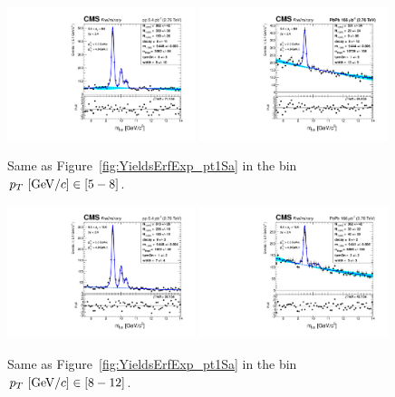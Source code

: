 \begin{figure}
   \includegraphics[width=0.49\textwidth]{Chapters/aYield/pp/pt_3p5_4/Pt/Pt_5_8/pp2p76tev_Pt_5_8_fsr1.pdf}  
  \includegraphics[width=0.49\textwidth]{Chapters/aYield/PbPb/pt_3p5_4/Pt/Pt_5_8/PbPb_Pt_5_8_fsr1.pdf}
 
  \caption{Same as Figure~\ref{fig:YieldsErfExp_pt1Sa} in the bin $p_{T}~[{\rm GeV}/c]\in [5 - 8]$.}
  \label{fig:YieldsErfExp_pt1Sc} 
\end{figure}
\begin{figure}
  \includegraphics[width=0.49\textwidth]{Chapters/aYield/pp/pt_3p5_4/Pt/Pt_8_12/pp2p76tev_Pt_8_12_fsr1.pdf}  
  \includegraphics[width=0.49\textwidth]{Chapters/aYield/PbPb/pt_3p5_4/Pt/Pt_8_12/PbPb_Pt_8_12_fsr1.pdf}
  \caption{Same as Figure~\ref{fig:YieldsErfExp_pt1Sa} in the bin $p_{T}~[{\rm GeV}/c]\in [8 - 12]$.}
  \label{fig:YieldsErfExp_pt1Sd} 
\end{figure}
